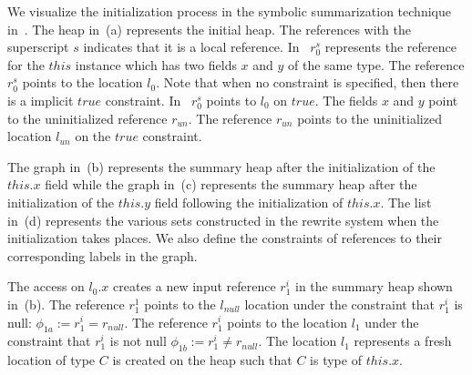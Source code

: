 We visualize the initialization process in the symbolic summarization
technique in~. The heap
in~(a) represents the initial heap. The
references with the superscript $s$ indicates that it is a local
reference. In~ $r_0^s$ represents the reference
for the $\mathit{this}$ instance which has two fields $x$ and $y$ of
the same type. The reference $r_0^s$ points to the location
$l_0$. Note that when no constraint is specified, then there is a
implicit $\mathit{true}$ constraint. In~ $r_0^s$
points to $l_0$ on $\mathit{true}$. The fields $x$ and $y$ point to
the uninitialized reference $r_\mathit{un}$. The reference
$r_\mathit{un}$ points to the uninitialized location $l_\mathit{un}$
on the $\mathit{true}$ constraint.

The graph in~(b) represents the summary heap
after the initialization of the $\mathit{this}.x$ field while the
graph in~(c) represents the summary heap after
the initialization of the $\mathit{this}.y$ field following the
initialization of $\mathit{this}.x$. The list
in~(d) represents the various sets constructed in
the rewrite system when the initialization takes places. We also
define the constraints of references to their corresponding labels in
the graph.

The access on $l_0.x$ creates a new input reference $r_1^i$ in the
summary heap shown in~(b). The reference $r_1^1$
points to the $l_\mathit{null}$ location under the constraint that
$r_1^i$ is null: $\phi_{1a} := r_1^i = r_\mathit{null}$. The reference
$r_1^i$ points to the location $l_1$ under the constraint that $r_1^i$
is not null $\phi_{1b} :=r_1^i \neq r_\mathit{null}$. The location
$l_1$ represents a fresh location of type $C$ is created on the heap
such that $C$ is type of $\mathit{this}.x$.





